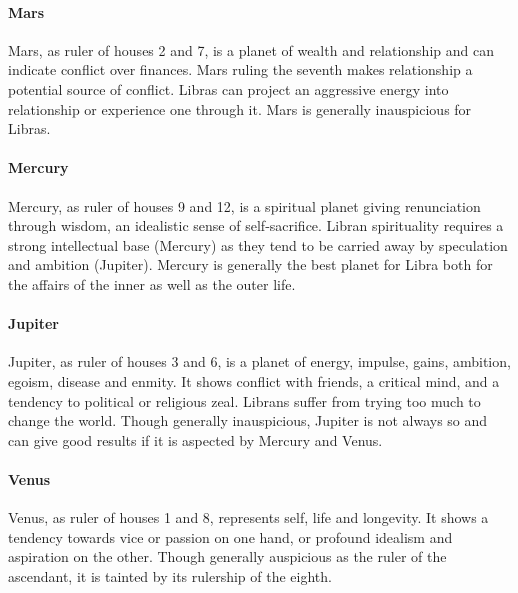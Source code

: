  

\paragraph{Mars}

Mars, as ruler of houses 2 and 7, is a planet of wealth and relationship and can indicate conflict over finances. Mars ruling the seventh makes relationship a potential source of conflict. Libras can project an aggressive energy into relationship or experience one through it.  Mars is generally inauspicious for Libras.

 

\paragraph{Mercury}

Mercury, as ruler of houses 9 and 12, is a spiritual planet giving renunciation through wisdom, an idealistic sense of self‑sacrifice. Libran spirituality requires a strong intellectual base (Mercury) as they tend to be carried away by speculation and ambition (Jupiter). Mercury is generally the best planet for Libra both for the affairs of the inner as well as the outer life.

 

\paragraph{Jupiter}

Jupiter, as ruler of houses 3 and 6, is a planet of energy, impulse, gains, ambition, egoism, disease and enmity. It shows conflict with friends, a critical mind, and a tendency to political or religious zeal. Librans suffer from trying too much to change the world. Though generally inauspicious, Jupiter is not always so and can give good results if it is aspected by Mercury and Venus.

 

\paragraph{Venus}

Venus, as ruler of houses 1 and 8, represents self, life and longevity. It shows a tendency towards vice or passion on one hand, or profound idealism and aspiration on the other. Though generally auspicious as the ruler of the ascendant, it is tainted by its rulership of the eighth.

 

